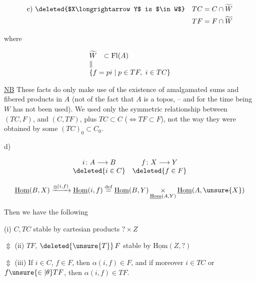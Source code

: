 

\[
\begin{aligned}
\text{c) }\text{\deleted{$X\longrightarrow Y$ is $\in W$}}\quad TC&=C\cap\widetilde W\\
TF&=F\cap\widetilde W
\end{aligned}
\]

where

\[
\begin{array}{ll}
\widetilde W&\subset\mathrm{Fl}(A)\\
\Vert&\\
\multicolumn{2}{l}{\{f=pi\mid p\in TF,\ i\in TC\}}
\end{array}
\]

\uline{NB} These facts do only make use of the existence of  amalgamated sums and fibered products in $A$ (not of the fact that $A$ is a topos, -- and for the time being $W$ has not been used). We used only the symmetric relationship between  $(TC,F)$, and $(C,TF)$,  plus $TC\subset C$ ($\Longleftrightarrow TF\subset F$), not the way they were obtained by some  $(TC)_0\subset C_0$.

d)  

\[
\begin{array}{cc}
i\colon A\longrightarrow B&f\colon X\longrightarrow Y\\
\deleted{i\in C}&\deleted{f\in F}
\end{array}
\]


\[
\underline{\mathrm{Hom}}(B,X)\xrightarrow{\underline{\alpha}(i,f)}
\underline{\mathrm{Hom}}(i,f)\overset{\mathrm{def}}=
\underline{\mathrm{Hom}}(B,Y)\mathop{\times}_{\underline{\mathrm{Hom}}(A,Y)}\underline{\mathrm{Hom}}(A,\unsure{X})
\]

 Then we have the following 

(i) $C,TC$ stable by cartesian products $? \times Z$

$\Updownarrow$ (ii) $TF$, $\deleted{\unsure{T}}\,F$ stable by $\underline{\mathrm{Hom}}(Z,?)$

$\Updownarrow$ (iii) If $i\in C$, $f\in F$, then $\alpha(i,f)\in F$, and if moreover $i\in TC$ or $f\unsure{\in|\theta}TF$, then $\alpha(i,f)\in TF$.


